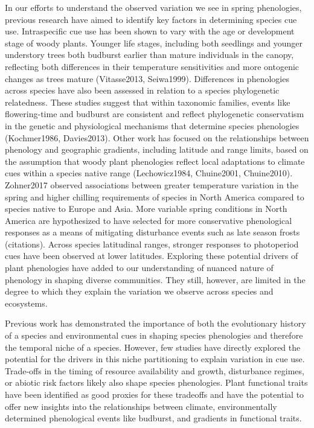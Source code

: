 \documentclass{article}\usepackage[]{graphicx}\usepackage[]{color}
\begin{document}
In our efforts to understand the observed variation we see in spring phenologies, previous research have aimed to identify key factors in determining species cue use. Intraspecific cue use has been shown to vary with the age or development stage of woody plants. Younger life stages, including both seedlings and younger understory trees both budburst earlier than mature individuals in the canopy, reflecting both differences in their temperature sensitivities and more ontogenic changes as trees mature (Vitasse2013, Seiwa1999). Differences in phenologies across species have also been assessed in relation to a species phylogenetic relatedness. These studies suggest that within taxonomic families, events like flowering-time and budburst are consistent and reflect phylogenetic conservatism in the genetic and physiological mechanisms that determine species phenologies (Kochmer1986, Davies2013). Other work has focused on the relationships between phenology and geographic gradients, including latitude and range limits, based on the assumption that woody plant phenologies reflect local adaptations to climate cues within a species native range (Lechowicz1984, Chuine2001, Chuine2010). Zohner2017 observed associations between greater temperature variation in the spring and higher chilling requirements of species in North America compared to species native to Europe and Asia. More variable spring conditions in North America are hypothesized to have selected for more conservative phenological responses as a means of mitigating disturbance events such as late season frosts (citations). Across species latitudinal ranges, stronger responses to photoperiod cues have been observed at lower latitudes. Exploring these potential drivers of plant phenologies have added to our understanding of nuanced nature of phenology in shaping diverse communities. They still, however, are limited in the degree to which they explain the variation we observe across species and ecosystems.

Previous work has demonstrated the importance of both the evolutionary history of a species and environmental cues in shaping species phenologies and therefore the temporal niche of a species. However, few studies have directly explored the potential for the drivers in this niche partitioning to explain variation in cue use. Trade-offs in the timing of resource availability and growth, disturbance regimes, or abiotic risk factors likely also shape species phenologies. Plant functional traits have been identified as good proxies for these tradeoffs and have the potential to offer new insights into the relationships between climate, environmentally determined phenological events like budburst, and gradients in functional traits.
\end{document}
